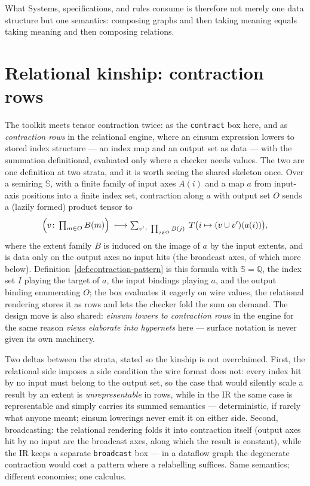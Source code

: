 What Systems, specifications, and rules consume is therefore not
merely one data structure but one semantics: composing graphs and
then taking meaning equals taking meaning and then composing
relations.

\section{Relational kinship: contraction rows}
\label{sec:hyp-tensors}

The toolkit meets tensor contraction twice: as the \texttt{contract}
box here, and as \emph{contraction rows} in the relational engine,
where an einsum expression lowers to stored index structure --- an
index map and an output set as data --- with the summation
definitional, evaluated only where a checker needs values. The two
are one definition at two strata, and it is worth seeing the shared
skeleton once. Over a semiring $\mathbb{S}$, with a finite family of
input axes $A(i)$ and a map $a$ from input-axis positions into a
finite index set, contraction along $a$ with output set $O$ sends a
(lazily formed) product tensor to
\[
\Bigl(v \colon \textstyle\prod_{m \in O} B(m)\Bigr) \;\longmapsto
\sum_{v' \colon \prod_{j \notin O} B(j)}\;
T\bigl(i \mapsto (v \cup v')(a(i))\bigr),
\]
where the extent family $B$ is induced on the image of $a$ by the
input extents, and is data only on the output axes no input hits
(the broadcast axes, of which more below).
Definition~\ref{def:contraction-pattern} is this formula with
$\mathbb{S} = \mathbb{Q}$, the index set $I$ playing the target of
$a$, the input bindings playing $a$, and the output binding
enumerating $O$; the box evaluates it eagerly on wire values, the
relational rendering stores it as rows and lets the checker fold the
sum on demand. The design move is also shared: \emph{einsum lowers
to contraction rows} in the engine for the same reason \emph{views
elaborate into hypernets} here --- surface notation is never given
its own machinery.

Two deltas between the strata, stated so the kinship is not
overclaimed. First, the relational side imposes a side condition the
wire format does not: every index hit by no input must belong to the
output set, so the case that would silently scale a result by an
extent is \emph{unrepresentable} in rows, while in the IR the same
case is representable and simply carries its summed semantics ---
deterministic, if rarely what anyone meant; einsum lowerings never
emit it on either side. Second, broadcasting: the relational
rendering folds it into contraction itself (output axes hit by no
input are the broadcast axes, along which the result is constant),
while the IR keeps a separate \texttt{broadcast} box --- in a
dataflow graph the degenerate contraction would cost a pattern where
a relabelling suffices. Same semantics; different economies; one
calculus.

